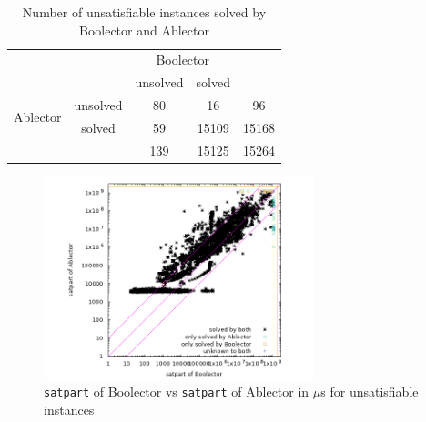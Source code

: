 \begin{table}[ht]
    \begin{center}
    \begin{tabular}{cc|c|c|c}
        &&\multicolumn{2}{c|}{Boolector}&\\
        &&unsolved&solved&\\ \hline
        \multirow{2}{*}{Ablector}&unsolved& 80 & 16 & 96 \\ \cline{2-5}
        & solved & 59 & 15109 & 15168 \\ \hline
        & & 139 & 15125 & 15264 \\
    \end{tabular}
    \end{center}
    \caption{Number of unsatisfiable instances solved by Boolector and Ablector}
    \label{tab:evaluation:unsat:solvedUnsolved}
\end{table}

\begin{figure}[]
    \centering
        \includegraphics[width=0.7\textwidth]{plots/unsat/Boolector-vs-Ablector-satpart.png}
    \caption{\texttt{satpart} of Boolector vs \texttt{satpart} of Ablector in $\mu$s for unsatisfiable instances}
    \label{fig:evaluation:unsat:scatter}
\end{figure}

